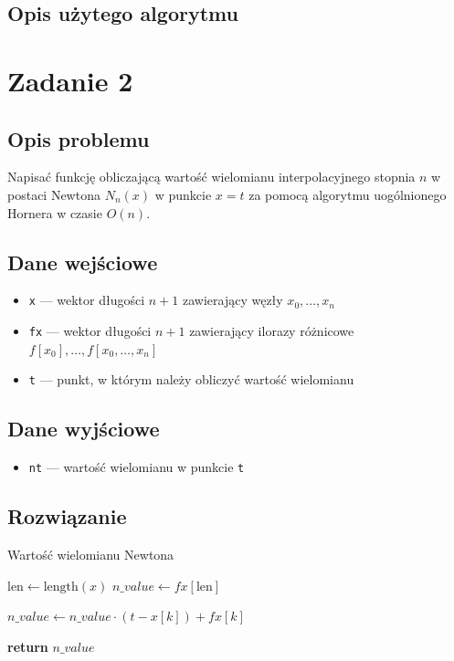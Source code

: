 \documentclass{article}
\begin{document}
\subsection*{Opis użytego algorytmu}

\section*{Zadanie 2}
\subsection*{Opis problemu}
	Napisać funkcję obliczającą wartość wielomianu interpolacyjnego stopnia $n$ w postaci Newtona $N_n(x)$ w punkcie $x = t$ za pomocą algorytmu uogólnionego Hornera w czasie $O(n)$.
\subsection*{Dane wejściowe}
	\begin{itemize}
	    \item \texttt{x} — wektor długości $n+1$ zawierający węzły $x_0,\dots,x_n$
	    \item \texttt{fx} — wektor długości $n+1$ zawierający ilorazy różnicowe $f[x_0], \dots, f[x_0,\dots,x_n]$
	    \item \texttt{t} — punkt, w którym należy obliczyć wartość wielomianu
	\end{itemize}
\subsection*{Dane wyjściowe}
	\begin{itemize}
	    \item \texttt{nt} — wartość wielomianu w punkcie \texttt{t}
	\end{itemize}
\subsection*{Rozwiązanie}
	\begin{algorithm}
	\caption{Wartość wielomianu Newtona}
	\begin{algorithmic}[1]
	        \State $\text{len} \gets \text{length}(x)$
	        \State $n\_value \gets fx[\text{len}]$
	        
	            \State $n\_value \gets n\_value \cdot (t - x[k]) + fx[k]$
	        \EndFor
	        
	        \State \textbf{return} $n\_value$
	    \EndFunction
	\end{algorithmic}
	\end{algorithm}
\end{document}
